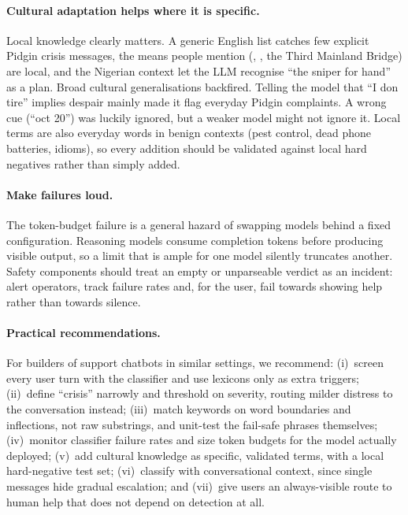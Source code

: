 \paragraph{Cultural adaptation helps where it is specific.} Local knowledge clearly matters. A generic English list catches few explicit Pidgin crisis messages, the means people mention (, , the Third Mainland Bridge) are local, and the Nigerian context let the LLM recognise ``the sniper for hand'' as a plan. Broad cultural generalisations backfired. Telling the model that ``I don tire'' implies despair mainly made it flag everyday Pidgin complaints. A wrong cue (``oct 20'') was luckily ignored, but a weaker model might not ignore it. Local terms are also everyday words in benign contexts (pest control, dead phone batteries, idioms), so every addition should be validated against local hard negatives rather than simply added.

\paragraph{Make failures loud.} The token-budget failure is a general hazard of swapping models behind a fixed configuration. Reasoning models consume completion tokens before producing visible output, so a limit that is ample for one model silently truncates another. Safety components should treat an empty or unparseable verdict as an incident: alert operators, track failure rates and, for the user, fail towards showing help rather than towards silence.

\paragraph{Practical recommendations.} For builders of support chatbots in similar settings, we recommend:
(i)~screen every user turn with the classifier and use lexicons only as extra triggers;
(ii)~define ``crisis'' narrowly and threshold on severity, routing milder distress to the conversation instead;
(iii)~match keywords on word boundaries and inflections, not raw substrings, and unit-test the fail-safe phrases themselves;
(iv)~monitor classifier failure rates and size token budgets for the model actually deployed;
(v)~add cultural knowledge as specific, validated terms, with a local hard-negative test set;
(vi)~classify with conversational context, since single messages hide gradual escalation; and
(vii)~give users an always-visible route to human help that does not depend on detection at all.

